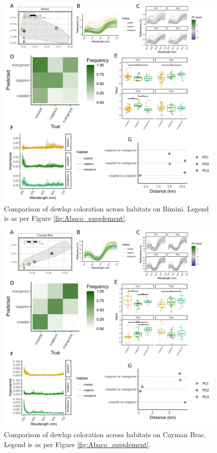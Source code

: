 \begin{figure}[H]
	\centering
	\includegraphics[width=\textwidth]{figures/Bimini_supplement.png}
	\caption{Comparison of dewlap coloration across habitats on Bimini. Legend is as per Figure \ref{fig:Abaco_supplement}.}
	\label{fig:Bimini}
\end{figure}

\begin{figure}[H]
	\centering
	\includegraphics[width=\textwidth]{figures/CaymanBrac_supplement.png}
	\caption{Comparison of dewlap coloration across habitats on Cayman Brac. Legend is as per Figure \ref{fig:Abaco_supplement}.}
	\label{fig:CaymanBrac}
\end{figure}

